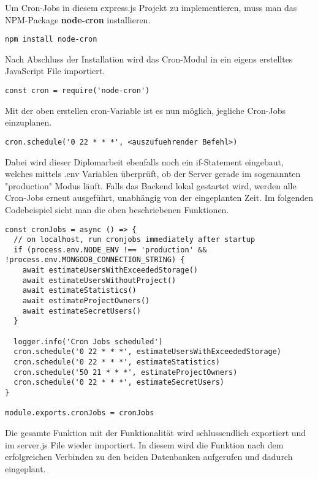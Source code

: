 Um Cron-Jobs in diesem express.js Projekt zu implementieren, muss man das NPM-Package \textbf{node-cron} installieren.
\begin{verbatim}
npm install node-cron
\end{verbatim}
Nach Abschluss der Installation wird das Cron-Modul in ein eigens erstelltes JavaScript File importiert.
\begin{verbatim}
const cron = require('node-cron')
\end{verbatim}
Mit der oben erstellen cron-Variable ist es nun möglich, jegliche Cron-Jobs einzuplanen.
\newline
\begin{lstlisting}
cron.schedule('0 22 * * *', <auszufuehrender Befehl>)
\end{lstlisting}
Dabei wird dieser Diplomarbeit ebenfalls noch ein if-Statement eingebaut, welches mittels .env Variablen überprüft, ob der Server gerade im sogenannten "production" Modus läuft. Falls das Backend lokal gestartet wird, werden alle Cron-Jobs erneut ausgeführt, unabhängig von der eingeplanten Zeit. Im folgenden Codebeispiel sieht man die oben beschriebenen Funktionen.
\newline
\begin{lstlisting}
const cronJobs = async () => {
  // on localhost, run cronjobs immediately after startup
  if (process.env.NODE_ENV !== 'production' && !process.env.MONGODB_CONNECTION_STRING) {
    await estimateUsersWithExceededStorage()
    await estimateUsersWithoutProject()
    await estimateStatistics()
    await estimateProjectOwners()
    await estimateSecretUsers()
  }

  logger.info('Cron Jobs scheduled')
  cron.schedule('0 22 * * *', estimateUsersWithExceededStorage)
  cron.schedule('0 22 * * *', estimateStatistics)
  cron.schedule('50 21 * * *', estimateProjectOwners)
  cron.schedule('0 22 * * *', estimateSecretUsers)
}

module.exports.cronJobs = cronJobs
\end{lstlisting}
Die gesamte Funktion mit der Funktionalität wird schlussendlich exportiert und im server.js File wieder importiert. In diesem wird die Funktion nach dem erfolgreichen Verbinden zu den beiden Datenbanken aufgerufen und dadurch eingeplant.
